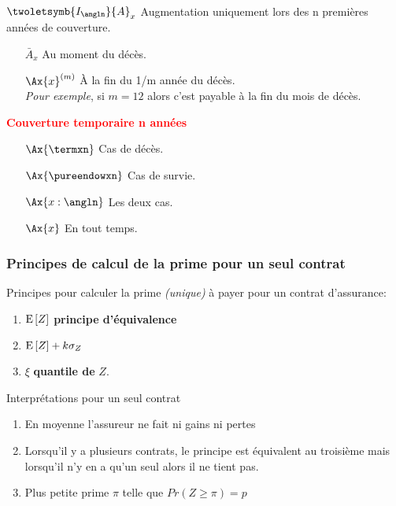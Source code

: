 \documentclass[10pt, french]{article}
\begin{document}
\begin{multicols*}{3}
\textbf{{}}\\
$\twoletsymb{I_{\angln}}{A}_{x}$ Augmentation uniquement lors des n premières années de couverture.

\textbf{{}}
\begin{itemize}
	\item[$\bar{A}_x$] Au moment du décès.
	\item[$\Ax{x}^{(m)}$] À la fin du 1/m année du décès.\\
	\textit{Pour exemple}, si $m = 12$ alors c'est payable à la fin du mois de décès.
\end{itemize}

\textbf{\textcolor{red}{Couverture temporaire n années}}
\begin{itemize}
	\item[$\Ax{\termxn}$] Cas de décès.
	\item[$\Ax{\pureendowxn}$] Cas de survie.
	\item[$\Ax{x:\angln}$] Les deux cas.
	\item[$\Ax{x}$] En tout temps.
\end{itemize}

\subsubsection*{Principes de calcul de la prime pour un seul contrat}


Principes pour calculer la prime \textit{(unique)} à payer pour un contrat d'assurance:
\begin{enumerate}
	\item $\mathrm{E} \left[ Z \right]$ \textbf{principe d'équivalence}
	\item $\mathrm{E} \left[ Z \right] + k \sigma_Z$
	\item $\xi$ \textbf{quantile de} $Z$.\\
\end{enumerate}

Interprétations pour un seul contrat
\begin{enumerate}
	\item En moyenne l'assureur ne fait ni gains ni pertes
	\item Lorsqu'il y a plusieurs contrats, le principe est équivalent au troisième mais lorsqu'il n'y en a qu'un seul alors il ne tient pas.
	\item Plus petite prime $\pi$ telle que $Pr(Z \ge \pi) = p$
\end{enumerate}


\end{multicols*}
\end{document}
